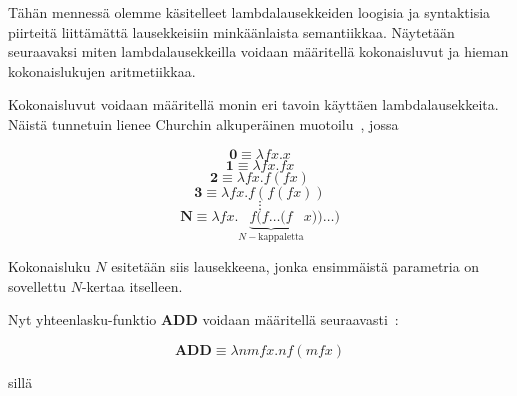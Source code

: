 Tähän mennessä olemme käsitelleet lambdalausekkeiden loogisia ja syntaktisia piirteitä liittämättä lausekkeisiin minkäänlaista semantiikkaa. Näytetään seuraavaksi miten lambdalausekkeilla voidaan määritellä kokonaisluvut ja hieman kokonaislukujen aritmetiikkaa.
   
\begin{esim}
Kokonaisluvut voidaan määritellä monin eri tavoin käyttäen lambdalausekkeita. Näistä tunnetuin lienee Churchin alkuperäinen muotoilu~\cite[s.~20]{Sel2013}, jossa

\[ \textbf{0} \equiv \lambda fx . x \]
\[ \textbf{1} \equiv \lambda fx . fx \]
\[ \textbf{2} \equiv \lambda fx . f (fx) \] 
\[ \textbf{3} \equiv \lambda fx . f(f(fx)) \]
\[ \vdots \]
\[ \textbf{N} \equiv \lambda fx . \underbrace{ f ( f \ldots (f }_{ N-\text{kappaletta}} x)) \ldots ) \]
 
Kokonaisluku $N$ esitetään siis lausekkeena, jonka ensimmäistä parametria on sovellettu $N$-kertaa itselleen.

\par

Nyt yhteenlasku-funktio  \textbf{ADD} voidaan määritellä seuraavasti~\cite[s.~20]{Sel2013}:

\[ \textbf{ADD} \equiv \lambda nmfx . n f (m f x) \] 

sillä 



\end{esim}
